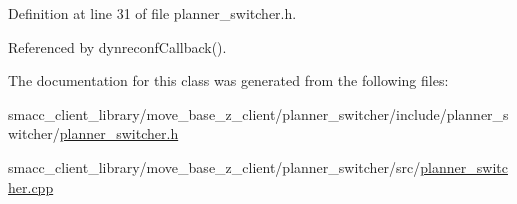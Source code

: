 Definition at line 31 of file planner\+\_\+switcher.\+h.



Referenced by dynreconf\+Callback().



The documentation for this class was generated from the following files\+:\begin{DoxyCompactItemize}
\item 
smacc\+\_\+client\+\_\+library/move\+\_\+base\+\_\+z\+\_\+client/planner\+\_\+switcher/include/planner\+\_\+switcher/\hyperlink{planner__switcher_8h}{planner\+\_\+switcher.\+h}\item 
smacc\+\_\+client\+\_\+library/move\+\_\+base\+\_\+z\+\_\+client/planner\+\_\+switcher/src/\hyperlink{planner__switcher_8cpp}{planner\+\_\+switcher.\+cpp}\end{DoxyCompactItemize}
